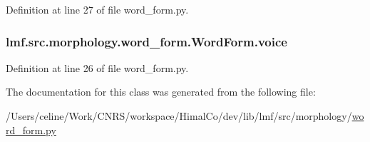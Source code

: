 Definition at line 27 of file word\+\_\+form.\+py.

\hypertarget{classlmf_1_1src_1_1morphology_1_1word__form_1_1_word_form_ac08b72f6837815d9d11d3cb0a36ed932}{
\subsubsection[{voice}]{\setlength{\rightskip}{0pt plus 5cm}lmf.\+src.\+morphology.\+word\+\_\+form.\+Word\+Form.\+voice}}\label{classlmf_1_1src_1_1morphology_1_1word__form_1_1_word_form_ac08b72f6837815d9d11d3cb0a36ed932}


Definition at line 26 of file word\+\_\+form.\+py.



The documentation for this class was generated from the following file\+:\begin{DoxyCompactItemize}
\item 
/\+Users/celine/\+Work/\+C\+N\+R\+S/workspace/\+Himal\+Co/dev/lib/lmf/src/morphology/\hyperlink{word__form_8py}{word\+\_\+form.\+py}\end{DoxyCompactItemize}
